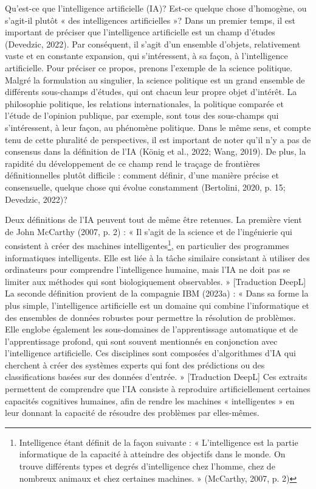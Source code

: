 \documentclass[
  letterpaper,
  DIV=11,
  numbers=noendperiod]{scrreprt}
\begin{document}
Qu'est-ce que l'intelligence artificielle (IA)? Est-ce quelque chose
d'homogène, ou s'agit-il plutôt « des intelligences artificielles »?
Dans un premier temps, il est important de préciser que l'intelligence
artificielle est un champ d'études (Devedzic, 2022). Par conséquent, il
s'agit d'un ensemble d'objets, relativement vaste et en constante
expansion, qui s'intéressent, à sa façon, à l'intelligence artificielle.
Pour préciser ce propos, prenons l'exemple de la science politique.
Malgré la formulation au singulier, la science politique est un grand
ensemble de différents sous-champs d'études, qui ont chacun leur propre
objet d'intérêt. La philosophie politique, les relations
internationales, la politique comparée et l'étude de l'opinion publique,
par exemple, sont tous des sous-champs qui s'intéressent, à leur façon,
au phénomène politique. Dans le même sens, et compte tenu de cette
pluralité de perspectives, il est important de noter qu'il n'y a pas de
consensus dans la définition de l'IA (König et al., 2022; Wang, 2019).
De plus, la rapidité du développement de ce champ rend le traçage de
frontières définitionnelles plutôt difficile : comment définir, d'une
manière précise et consensuelle, quelque chose qui évolue constamment
(Bertolini, 2020, p. 15; Devedzic, 2022)?

Deux définitions de l'IA peuvent tout de même être retenues. La première
vient de John McCarthy (2007, p. 2) : « Il s'agit de la science et de
l'ingénierie qui consistent à créer des machines
intelligentes\footnote{Intelligence étant définit de la façon suivante :
  « L'intelligence est la partie informatique de la capacité à atteindre
  des objectifs dans le monde. On trouve différents types et degrés
  d'intelligence chez l'homme, chez de nombreux animaux et chez
  certaines machines. » (McCarthy, 2007, p. 2)}, en particulier des
programmes informatiques intelligents. Elle est liée à la tâche
similaire consistant à utiliser des ordinateurs pour comprendre
l'intelligence humaine, mais l'IA ne doit pas se limiter aux méthodes
qui sont biologiquement observables. » {[}Traduction DeepL{]} La seconde
définition provient de la compagnie IBM (2023a) : « Dans sa forme la
plus simple, l'intelligence artificielle est un domaine qui combine
l'informatique et des ensembles de données robustes pour permettre la
résolution de problèmes. Elle englobe également les sous-domaines de
l'apprentissage automatique et de l'apprentissage profond, qui sont
souvent mentionnés en conjonction avec l'intelligence artificielle. Ces
disciplines sont composées d'algorithmes d'IA qui cherchent à créer des
systèmes experts qui font des prédictions ou des classifications basées
sur des données d'entrée. » {[}Traduction DeepL{]} Ces extraits
permettent de comprendre que l'IA consiste à reproduire artificiellement
certaines capacités cognitives humaines, afin de rendre les machines «
intelligentes » en leur donnant la capacité de résoudre des problèmes
par elles-mêmes.
\end{document}
